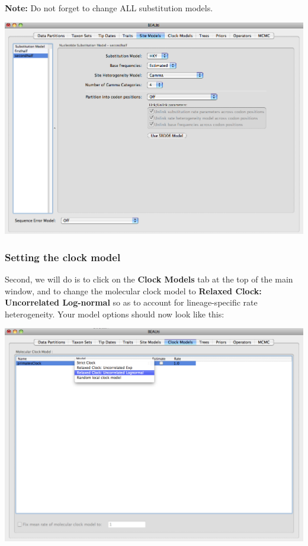 \documentclass[12pt]{article}
\begin{document}
\textbf{Note:} Do not forget to change ALL substitution models.

\medskip{}

\includegraphics[scale=0.4]{figures/BEAUti_Model}

\medskip{}


\subsubsection*{Setting the clock model}

Second, we will do is to click on the {\bf Clock Models} tab at the top of the
main window, and to change the molecular clock model to \textbf{Relaxed Clock: Uncorrelated
Log-normal} so as to account for lineage-specific rate heterogeneity.
Your model options should now look like this: 

\medskip{}

\includegraphics[scale=0.4]{figures/BEAUti_Clock}
\end{document}
